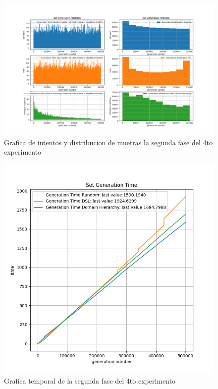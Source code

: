 \begin{figure}[!ht]
      \includegraphics[width=\linewidth]{Graphics/exp7.png}
      \caption{Grafica de intentos y distribucion de muetras la segunda fase del 4to experimento}
      \label{fig:exp_7}
\end{figure}

\newpage

\begin{figure}[H]
      \includegraphics[width=\linewidth]{Graphics/exp6.png}
      \caption{Grafica temporal de la segunda fase del 4to experimento}
      \label{fig:exp_6}
\end{figure}

